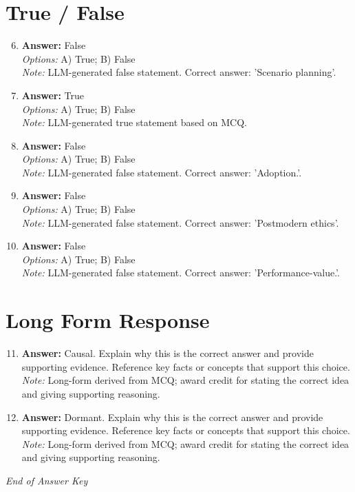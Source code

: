 \documentclass[12pt]{article}
\begin{document}
\section*{True / False}
\begin{enumerate}[label=\arabic*.]
\setcounter{enumi}{5}
\item \textbf{Answer:} False
\\ \textit{Options:} A) True; B) False
\\ \textit{Note:} LLM-generated false statement. Correct answer: 'Scenario planning'.
\item \textbf{Answer:} True
\\ \textit{Options:} A) True; B) False
\\ \textit{Note:} LLM-generated true statement based on MCQ.
\item \textbf{Answer:} False
\\ \textit{Options:} A) True; B) False
\\ \textit{Note:} LLM-generated false statement. Correct answer: 'Adoption.'.
\item \textbf{Answer:} False
\\ \textit{Options:} A) True; B) False
\\ \textit{Note:} LLM-generated false statement. Correct answer: 'Postmodern ethics'.
\item \textbf{Answer:} False
\\ \textit{Options:} A) True; B) False
\\ \textit{Note:} LLM-generated false statement. Correct answer: 'Performance-value.'.
\end{enumerate}

\section*{Long Form Response}
\begin{enumerate}[label=\arabic*.]
\setcounter{enumi}{10}
\item \textbf{Answer:} Causal. Explain why this is the correct answer and provide supporting evidence. Reference key facts or concepts that support this choice.
\\ \textit{Note:} Long-form derived from MCQ; award credit for stating the correct idea and giving supporting reasoning.
\item \textbf{Answer:} Dormant. Explain why this is the correct answer and provide supporting evidence. Reference key facts or concepts that support this choice.
\\ \textit{Note:} Long-form derived from MCQ; award credit for stating the correct idea and giving supporting reasoning.
\end{enumerate}

\vfill
\noindent\textit{End of Answer Key}
\end{document}
